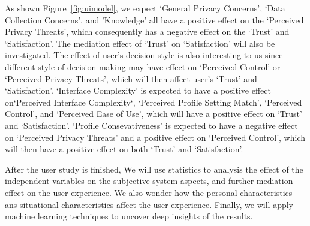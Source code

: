 As shown Figure~\ref{fig:uimodel}, we expect `General Privacy Concerns', `Data Collection Concerns', and 'Knowledge' all have a positive effect on the `Perceived Privacy Threats', which consequently has a negative effect on the `Trust' and `Satisfaction'. The mediation effect of `Trust' on `Satisfaction' will also be investigated. The effect of user's decision style is also interesting to us since different style of decision making may have effect on `Perceived Control' or `Perceived Privacy Threats', which will then affect user's `Trust' and `Satisfaction'. `Interface Complexity' is expected to have a positive effect on`Perceived Interface Complexity`, `Perceived Profile Setting Match', `Perceived Control', and `Perceived Ease of Use', which will have a positive effect on `Trust' and `Satisfaction'. `Profile Consevativeness' is expected to have a negative effect on `Perceived Privacy Threats' and a positive effect on `Perceived Control', which will then have a positive effect on both `Trust' and `Satisfaction'.

After the user study is finished, We will use statistics to analysis the effect of the independent variables on the subjective system aspects, and further mediation effect on the user experience. We also wonder how the personal characteristics ans situational characteristics affect the user experience. Finally, we will apply machine learning techniques to uncover deep insights of the results.